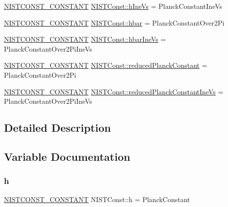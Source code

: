 \begin{DoxyCompactItemize}
\item 
\mbox{\hyperlink{group___n_i_s_t_const-_macros_ga2b0fc1d7452373f816175dd86ce26729}{N\+I\+S\+T\+C\+O\+N\+S\+T\+\_\+\+C\+O\+N\+S\+T\+A\+NT}} \mbox{\hyperlink{group___n_i_s_t_const-_planck_constant_gada98075561307d5e40b086c0b0b21996}{N\+I\+S\+T\+Const\+::h\+Ine\+Vs}} = Planck\+Constant\+Ine\+Vs
\item 
\mbox{\hyperlink{group___n_i_s_t_const-_macros_ga2b0fc1d7452373f816175dd86ce26729}{N\+I\+S\+T\+C\+O\+N\+S\+T\+\_\+\+C\+O\+N\+S\+T\+A\+NT}} \mbox{\hyperlink{group___n_i_s_t_const-_planck_constant_ga60e6824bfbb9d7b1050439c6962e8be0}{N\+I\+S\+T\+Const\+::hbar}} = Planck\+Constant\+Over2\+Pi
\item 
\mbox{\hyperlink{group___n_i_s_t_const-_macros_ga2b0fc1d7452373f816175dd86ce26729}{N\+I\+S\+T\+C\+O\+N\+S\+T\+\_\+\+C\+O\+N\+S\+T\+A\+NT}} \mbox{\hyperlink{group___n_i_s_t_const-_planck_constant_gaabd064b4a99463ee079bbd36e7234e51}{N\+I\+S\+T\+Const\+::hbar\+Ine\+Vs}} = Planck\+Constant\+Over2\+Pi\+Ine\+Vs
\item 
\mbox{\hyperlink{group___n_i_s_t_const-_macros_ga2b0fc1d7452373f816175dd86ce26729}{N\+I\+S\+T\+C\+O\+N\+S\+T\+\_\+\+C\+O\+N\+S\+T\+A\+NT}} \mbox{\hyperlink{group___n_i_s_t_const-_planck_constant_gab1c9a096e23274f5833a09c9c5ddbcf0}{N\+I\+S\+T\+Const\+::reduced\+Planck\+Constant}} = Planck\+Constant\+Over2\+Pi
\item 
\mbox{\hyperlink{group___n_i_s_t_const-_macros_ga2b0fc1d7452373f816175dd86ce26729}{N\+I\+S\+T\+C\+O\+N\+S\+T\+\_\+\+C\+O\+N\+S\+T\+A\+NT}} \mbox{\hyperlink{group___n_i_s_t_const-_planck_constant_ga0c6caaacccb3fd7fb2fac8c4fa0847a5}{N\+I\+S\+T\+Const\+::reduced\+Planck\+Constant\+Ine\+Vs}} = Planck\+Constant\+Over2\+Pi\+Ine\+Vs
\end{DoxyCompactItemize}


\subsection{Detailed Description}


\subsection{Variable Documentation}
\mbox{\label{group___n_i_s_t_const-_planck_constant_ga21af1e20e3f8458edb35866d476c1e2b}} 
\subsubsection{\texorpdfstring{h}{h}}
{\footnotesize\ttfamily \mbox{\hyperlink{group___n_i_s_t_const-_macros_ga2b0fc1d7452373f816175dd86ce26729}{N\+I\+S\+T\+C\+O\+N\+S\+T\+\_\+\+C\+O\+N\+S\+T\+A\+NT}} N\+I\+S\+T\+Const\+::h = Planck\+Constant}

